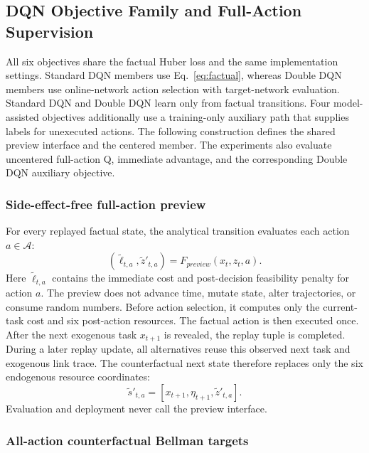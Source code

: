 \documentclass[remotesensing,article,submit,moreauthors]{Definitions/mdpi}
\begin{document}
\subsection{DQN Objective Family and Full-Action Supervision}
\label{sec:method}

All six objectives share the factual Huber loss and the same implementation settings. Standard DQN members use Eq.~\eqref{eq:factual}, whereas Double DQN members use online-network action selection with target-network evaluation. Standard DQN and Double DQN learn only from factual transitions. Four model-assisted objectives additionally use a training-only auxiliary path that supplies labels for unexecuted actions. The following construction defines the shared preview interface and the centered member. The experiments also evaluate uncentered full-action Q, immediate advantage, and the corresponding Double DQN auxiliary objective.

\subsubsection{Side-effect-free full-action preview}

For every replayed factual state, the analytical transition evaluates each action $a\in\mathcal A$:
\begin{equation}
(\tilde \ell_{t,a},\tilde z'_{t,a})=F_{preview}(x_t,z_t,a).
\end{equation}
Here $\tilde \ell_{t,a}$ contains the immediate cost and post-decision feasibility penalty for action $a$. The preview does not advance time, mutate state, alter trajectories, or consume random numbers. Before action selection, it computes only the current-task cost and six post-action resources. The factual action is then executed once. After the next exogenous task $x_{t+1}$ is revealed, the replay tuple is completed. During a later replay update, all alternatives reuse this observed next task and exogenous link trace. The counterfactual next state therefore replaces only the six endogenous resource coordinates:
\begin{equation}
\tilde s'_{t,a}=[x_{t+1},\eta_{t+1},\tilde z'_{t,a}].
\end{equation}
Evaluation and deployment never call the preview interface.

\subsubsection{All-action counterfactual Bellman targets}
\end{document}
